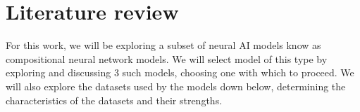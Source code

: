 \chapter{Literature review}
\label{chp:literature_review}

For this work, we will be exploring a subset of neural AI models know as compositional neural network models.
We will select model of this type by exploring and discussing 3 such models, choosing one with which to proceed.
We will also explore the datasets used by the models down below, determining the characteristics of the datasets and their strengths.


\clearpage
